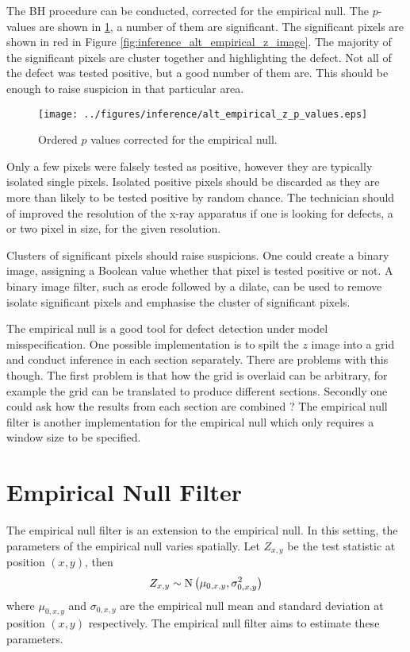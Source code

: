 The BH procedure can be conducted, corrected for the empirical null. The $p$-values are shown in \ref{fig:inference_alt_empirical_z_p_values}, a number of them are significant. The significant pixels are shown in red in Figure \ref{fig:inference_alt_empirical_z_image}. The majority of the significant pixels are cluster together and highlighting the defect. Not all of the defect was tested positive, but a good number of them are. This should be enough to raise suspicion in that particular area.

\begin{figure}
	\centering
	\texttt{[image: ../figures/inference/alt\_empirical\_z\_p\_values.eps]}
	\caption{Ordered $p$ values corrected for the empirical null.}
	\label{fig:inference_alt_empirical_z_p_values}
\end{figure}

Only a few pixels were falsely tested as positive, however they are typically isolated single pixels. Isolated positive pixels should be discarded as they are more than likely to be tested positive by random chance. The technician should of improved the resolution of the x-ray apparatus if one is looking for defects, a or two pixel in size, for the given resolution.

Clusters of significant pixels should raise suspicions. One could create a binary image, assigning a Boolean value whether that pixel is tested positive or not. A binary image filter, such as erode followed by a dilate, can be used to remove isolate significant pixels and emphasise the cluster of significant pixels.

The empirical null is a good tool for defect detection under model misspecification. One possible implementation is to spilt the $z$ image into a grid and conduct inference in each section separately. There are problems with this though. The first problem is that how the grid is overlaid can be arbitrary, for example the grid can be translated to produce different sections. Secondly one could ask how the results from each section are combined \citep{efron2008simultaneous}? The empirical null filter is another implementation for the empirical null which only requires a window size to be specified.


\section{Empirical Null Filter}

The empirical null filter is an extension to the empirical null. In this setting, the parameters of the empirical null varies spatially. Let $Z_{x,y}$ be the test statistic at position $(x,y)$, then
\begin{equation}
	Z_{x,y}\sim\operatorname{N}\left(
		\mu_{0,x,y},\sigma_{0,x,y}^2
	\right)
\end{equation}
where $\mu_{0,x,y}$ and $\sigma_{0,x,y}$ are the empirical null mean and standard deviation at position $(x,y)$ respectively. The empirical null filter aims to estimate these parameters.

